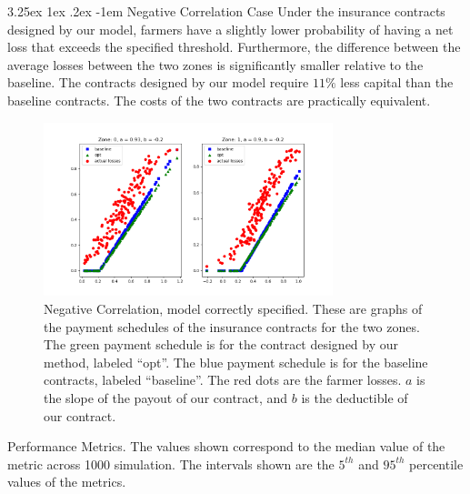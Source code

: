 \documentclass[11pt]{article}
\makeatletter
\newcounter{subsubsubsection}[subsubsection]
\renewcommand\paragraph{\@startsection{paragraph}{5}{\z@}%
  {3.25ex \@plus1ex \@minus.2ex}%
  {-1em}%
  {\normalfont\normalsize\bfseries}}
\makeatother
\begin{document}
        \paragraph{Negative Correlation Case} Under the insurance contracts designed by our model, farmers have a slightly lower probability of having a net loss that exceeds the specified threshold. Furthermore, the difference between the average losses between the two zones is significantly smaller relative to the baseline. The contracts designed by our model require $11\%$ less capital than the baseline contracts. The costs of the two contracts are practically equivalent. 
        \begin{figure}[H]
            \centering
            \includegraphics[width=0.75\textwidth]{../../output/figures/Logit_Bootstrap/neg_corr_linear_premium.png}
            \caption{Negative Correlation, model correctly specified. These are graphs of the payment schedules of the insurance contracts for the two zones. The green payment schedule is for the contract designed by our method, labeled ``opt''. The blue payment schedule is for the baseline contracts, labeled ``baseline''. The red dots are the farmer losses. $a$ is the slope of the payout of our contract, and $b$ is the deductible of our contract.}
        \end{figure}

        \begin{table}[H]
            \centering
            \small
            \caption{Performance Metrics. The values shown correspond to the median value of the metric across 1000 simulation. The intervals shown are the $5^{th}$ and $95^{th}$ percentile values of the metrics.}
            
        \end{table}
        \FloatBarrier

\end{document}
